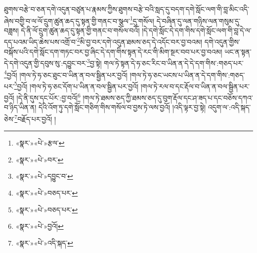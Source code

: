 ཐུགས་བརྩེ་བ་ཅན་དགེ་འདུན་བཙུན་པ་རྣམས་ཀྱིས་ཐུགས་བརྩེ་བའི་སླད་དུ་བདག་དགེ་སློང་ལག་གི་བླ་མིང་འདི་ཞེས་བགྱི་བ་ལ་ལོ་དྲུག་ཚུན་ཆད་དུ་སྟན་གྱི་གནང་བ་སྩལ་\footnote{«སྣར་»«པེ་»རྩལ་}དུ་གསོལ། དེ་བཞིན་དུ་ལན་གཉིས་ལན་གསུམ་དུ་བཟླས། དེ་ནི་ལོ་དྲུག་ཚུན་ཆད་དུ་སྟན་གྱི་གནང་བ་གསོལ་བའོ། །དེ་དགེ་སློང་དེ་དག་གིས་དགེ་སློང་ལག་གི་བླ་དེ་ལ་དད་པའམ་ཡིད་ཆེས་པས་འགྲོ་བ་\footnote{«སྣར་»«པེ་»བར་}མི་བྱ་བར་དགེ་འདུན་ཐམས་ཅད་དེ་འདོང་བར་བྱ་བའམ། དགེ་འདུན་གྱིས་བསྐོས་པའི་དགེ་སློང་དག་གཏང་བར་བྱ་ཞིང་དེ་དག་གིས་སྟན་དེ་རང་གི་མིག་སྔར་བབ་པར་བྱ་བའམ། ཡང་ན་སྟན་དེ་དགེ་འདུན་གྱི་དབུས་སུ་:དབྱུང་བར་\footnote{«སྣར་»«པེ་»དབྱུང་བ་}བྱ་སྟེ། གལ་ཏེ་སྟན་དེ་ཧ་ཅང་རིང་བ་ཡིན་ན་དེ་དེ་དག་གིས་:གཅད་པར་\footnote{«སྣར་»«པེ་»བཅད་པར་}བྱའོ། །གལ་ཏེ་ཧ་ཅང་ཐུང་བ་ཡིན་ན་བལ་སྦྱིན་པར་བྱའོ། །གལ་ཏེ་ཧ་ཅང་ཡངས་པ་ཡིན་ན་དེ་དག་གིས་:གཅད་པར་\footnote{«སྣར་»«པེ་»བཅད་པར་}བྱའོ། །གལ་ཏེ་ཧ་ཅང་དོག་པ་ཡིན་ན་བལ་སྦྱིན་པར་བྱའོ། །གལ་ཏེ་རལ་བ་དང་རྡོལ་བ་ཡིན་ན་བལ་སྦྱིན་པར་བྱའོ། །དེ་ནི་དུས་དང་པོར་:བྱ་བའོ།\footnote{«སྣར་»«པེ་»བྱའོ།} །གལ་ཏེ་ཐམས་ཅད་ཀྱི་ཐམས་ཅད་དུ་བུག་རྡོལ་དང་ཤ་ཟད་པ་དང་བཅོས་དཀའ་བ་ཉིད་ཡིན་ན། དེའི་འོག་ཏུ་དགེ་སློང་གཅིག་གིས་གསོལ་བ་བྱས་ཏེ་ལས་བྱའོ། །འདི་ལྟར་བྱ་སྟེ། འདུག་ལ་:འདི་སྐད་ཅེས་\footnote{«སྣར་»«པེ་»འདི་སྐད་}བརྗོད་པར་བྱའོ། །
